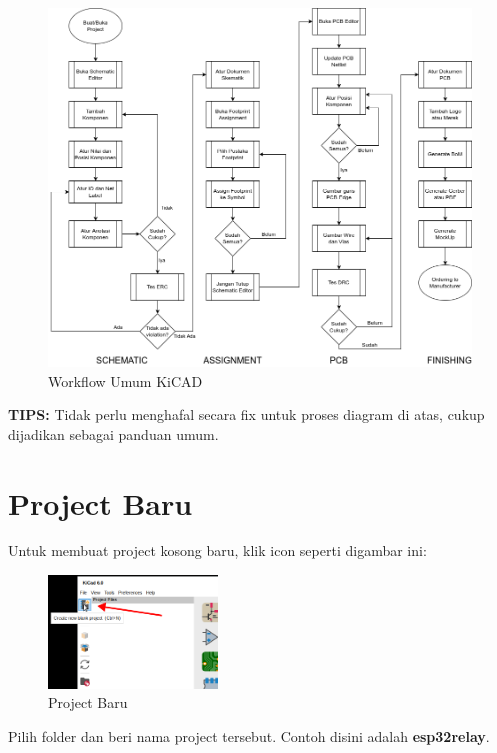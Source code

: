 \documentclass[12pt]{book}
\begin{document}
	\begin{figure}[!ht]
		\centering
		\includegraphics[width=\textwidth]{images/main/kicad_workflow}
		\caption{Workflow Umum KiCAD}
	\end{figure}

	\textbf{TIPS:} Tidak perlu menghafal secara fix untuk proses diagram di atas, cukup dijadikan sebagai panduan umum.

	\newpage
	\section{Project Baru}

	Untuk membuat project kosong baru, klik icon  seperti digambar ini:

	\begin{figure}[!ht]
		\centering
		\includegraphics[width=0.4\textwidth]{images/main/kicad_new_0}
		\caption{Project Baru}
	\end{figure}

	Pilih folder dan beri nama project tersebut. Contoh disini adalah \textbf{esp32relay}.
\end{document}
